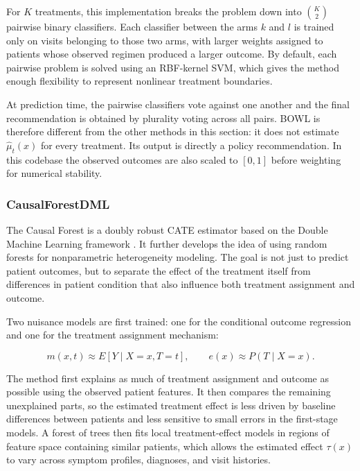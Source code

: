 \documentclass{article}
\begin{document}
For $K$ treatments, this implementation breaks the problem  down into $\binom{K}{2}$ pairwise binary classifiers. Each classifier between the arms $k$ and $l$ is trained only on visits belonging to those two arms, with larger weights assigned to patients whose observed regimen produced a larger outcome. By default, each pairwise problem is solved using an RBF-kernel SVM, which gives the method enough flexibility to represent nonlinear treatment boundaries.

At prediction time, the pairwise classifiers vote against one another and the final recommendation is obtained by plurality voting across all pairs. BOWL is therefore different from the other methods in this section: it does not estimate $\hat{\mu}_t(x)$ for every treatment. Its output is directly a policy recommendation. In this codebase the observed outcomes are also scaled to $[0,1]$ before weighting for numerical stability.

\subsubsection*{CausalForestDML}

The Causal Forest is a doubly robust CATE estimator based on the Double Machine Learning framework \cite{chernozhukov2018}. It further develops the idea of using random forests for nonparametric heterogeneity modeling. The goal is not just to predict patient outcomes, but to separate the effect of the treatment itself from differences in patient condition that also influence both treatment assignment and outcome.

Two nuisance models are first trained: one for the conditional outcome regression and one for the treatment assignment mechanism:

\begin{equation}
    m(x, t) \approx E[Y \mid X=x, T=t], \qquad e(x) \approx P(T \mid X=x).
\end{equation}

The method first explains as much of treatment assignment and outcome as possible using the observed patient features. It then compares the remaining unexplained parts, so the estimated treatment effect is less driven by baseline differences between patients and less sensitive to small errors in the first-stage models. A forest of trees then fits local treatment-effect models in regions of feature space containing similar patients, which allows the estimated effect $\tau(x)$ to vary across symptom profiles, diagnoses, and visit histories.
\end{document}
